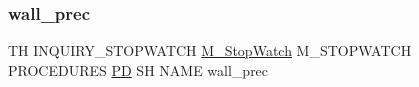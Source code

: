\subsubsection{\texorpdfstring{wall\+\_\+prec}{wall\_prec}}
{\footnotesize\ttfamily TH I\+N\+Q\+U\+I\+R\+Y\+\_\+\+S\+T\+O\+P\+W\+A\+T\+CH \hyperlink{option__stopwatch_83_8txt_aa2011fc45a5e502e87ee50996a8a9305}{M\+\_\+\+Stop\+Watch} M\+\_\+\+S\+T\+O\+P\+W\+A\+T\+CH P\+R\+O\+C\+E\+D\+U\+R\+ES \hyperlink{what__overview_81_8txt_a85f26da5a4481fbdb0d9c79f2b94de3e}{PD} SH N\+A\+ME wall\+\_\+prec}

